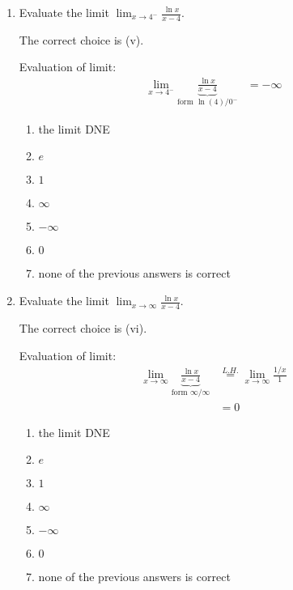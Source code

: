 \documentclass[nooutcomes,handout]{ximera}
\begin{document}
\begin{problem}
\begin{enumerate}
    \item
      Evaluate the limit $\lim_{x \to 4^-} \frac{\ln x}{x - 4}$.
      \begin{freeResponse}
        The correct choice is (v).

        Evaluation of limit:
        \begin{align*}
          \lim_{x \to 4^-} \underbrace{\frac{\ln x}{x - 4}}_{\text{form $\ln(4)/0^-$}} &= - \infty
        \end{align*}
      \end{freeResponse}

      \begin{enumerate}
        \item
          the limit DNE
        \item
          $e$
        \item
          $1$
        \item
          $\infty$
        \item
          $-\infty$
        \item
          $0$
        \item
          none of the previous answers is correct
      \end{enumerate}

    \item
      Evaluate the limit $\lim_{x \to \infty} \frac{\ln x}{x - 4}$.
      \begin{freeResponse}
        The correct choice is (vi).

        Evaluation of limit:
        \begin{align*}
          \lim_{x \to \infty} \underbrace{\frac{\ln x}{x - 4}}_{\text{form $\infty/\infty$}} &\stackrel{L.H.}{=} \lim_{x \to \infty} \frac{1/x}{1} \\
          &= 0
        \end{align*}

      \end{freeResponse}

      \begin{enumerate}
        \item
          the limit DNE
        \item
          $e$
        \item
          $1$
        \item
          $\infty$
        \item
          $-\infty$
        \item
          $0$
        \item
          none of the previous answers is correct
      \end{enumerate}


\end{enumerate}
\end{problem}
\end{document}
